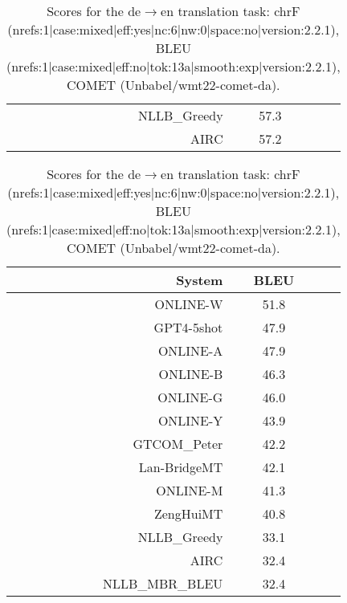 \documentclass[11pt]{article}
\begin{document}
\begin{table}
\begin{subtable}[t]{0.33\textwidth}
\begin{tabular}{rcc}
\rowcolor{ashgrey} NLLB\_Greedy   & 57.3 \\ 
AIRC  & 57.2 \\ 
\bottomrule 
\end{tabular} 
\end{subtable} 
\begin{subtable}[t]{0.33\textwidth}
\begin{tabular}{rcc}
\toprule 
System  & BLEU \\ 
\midrule 
\rowcolor{ashgrey} ONLINE-W   & 51.8 \\ 
\rowcolor{ashgrey} GPT4-5shot   & 47.9 \\ 
\rowcolor{ashgrey} ONLINE-A   & 47.9 \\ 
\rowcolor{ashgrey} ONLINE-B   & 46.3 \\ 
\rowcolor{ashgrey} ONLINE-G   & 46.0 \\ 
\rowcolor{ashgrey} ONLINE-Y   & 43.9 \\ 
\rowcolor{ashgrey} GTCOM\_Peter   & 42.2 \\ 
\rowcolor{ashgrey} Lan-BridgeMT   & 42.1 \\ 
\rowcolor{ashgrey} ONLINE-M   & 41.3 \\ 
\rowcolor{ashgrey} ZengHuiMT   & 40.8 \\ 
\rowcolor{ashgrey} NLLB\_Greedy   & 33.1 \\ 
AIRC  & 32.4 \\ 
\rowcolor{ashgrey} NLLB\_MBR\_BLEU   & 32.4 \\ 
\bottomrule 
\end{tabular} 
\end{subtable} 
 
\caption{Scores for the de$\rightarrow$en translation task: chrF (nrefs:1|case:mixed|eff:yes|nc:6|nw:0|space:no|version:2.2.1), BLEU (nrefs:1|case:mixed|eff:no|tok:13a|smooth:exp|version:2.2.1), COMET (Unbabel/wmt22-comet-da).} 
\end{table} 
\end{document}
